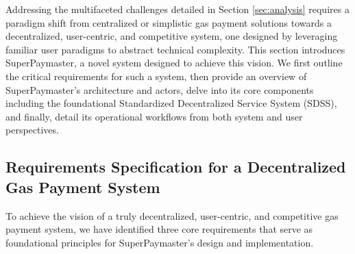 \documentclass[preprint,12pt]{elsarticle}
\begin{document}
Addressing the multifaceted challenges detailed in Section \ref{sec:analysis} requires a paradigm shift from centralized or simplistic gas payment solutions towards a decentralized, user-centric, and competitive system, one designed by leveraging familiar user paradigms to abstract technical complexity. This section introduces SuperPaymaster, a novel system designed to achieve this vision. We first outline the critical requirements for such a system, then provide an overview of SuperPaymaster's architecture and actors, delve into its core components including the foundational Standardized Decentralized Service System (SDSS), and finally, detail its operational workflows from both system and user perspectives.

\subsection{Requirements Specification for a Decentralized Gas Payment System}
\label{subsec:requirements}

To achieve the vision of a truly decentralized, user-centric, and competitive gas payment system, we have identified three core requirements that serve as foundational principles for SuperPaymaster's design and implementation.
\end{document}
